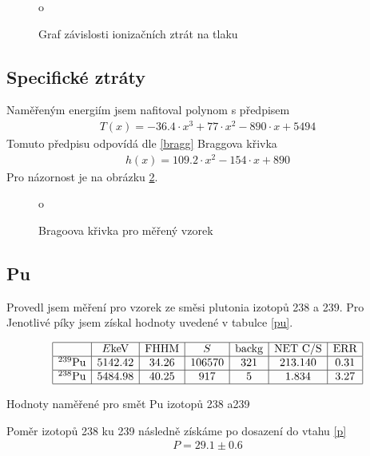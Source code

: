 \documentclass[a4paper,12pt]{article}
\begin{document}
\begin{figure}
\begin{center}
o
\end{center}
\caption{Graf závislosti ionizačních ztrát na tlaku}
\label{g}
\end{figure}



\subsection{Specifické ztráty}
Naměřeným energiím jsem nafitoval polynom s předpisem
\begin{eqnarray}
T(x)=-36.4\cdot x^3+77\cdot x^2-890\cdot x+5494
\end{eqnarray}
Tomuto předpisu odpovídá dle \ref{bragg} Braggova křivka
\begin{eqnarray}
h(x)=109.2\cdot x^2-154\cdot x+890
\end{eqnarray}
Pro názornost je na obrázku \ref{o1}.

\begin{figure}
\begin{center}
o
\end{center}
\caption{Bragoova křivka pro měřený vzorek}
\label{o1}
\end{figure}

\subsection{Pu}
Provedl jsem měření pro vzorek ze směsi plutonia izotopů 238 a 239. Pro Jenotlivé píky jsem získal hodnoty uvedené  v tabulce \ref{pu}.

\begin{table}
$$
\begin{array}{|c|c|c|c|c|c|c|}
\hline
&E\mbox{keV}&\mbox{FHHM}&S&\mbox{backg}&\mbox{NET C/S}& \mbox{ERR}\\ \hline
^{239}\mbox{Pu}&5142.42&34.26&106570&321&213.140&0.31\\ \hline
^{238}\mbox{Pu}&5484.98&40.25&917&5&1.834&3.27\\ \hline
\end{array}
$$
\caption{Hodnoty naměřené pro smět Pu izotopů 238 a239}
\label{pu}
\end{table}

Poměr izotopů 238 ku 239 následně získáme po dosazení do vtahu \ref{p}
\begin{eqnarray}
P=29.1 \pm 0.6
\end{eqnarray}
\end{document}
